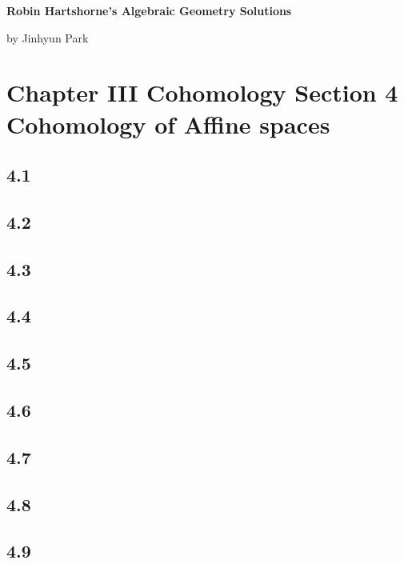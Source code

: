 \documentclass[11pt]{amsart}          %
\begin{document}
\begin{center}
\bf
\large Robin Hartshorne's Algebraic Geometry Solutions
\end{center}
\begin{center}
by Jinhyun Park
\end{center}
\vskip0.5cm

\section*{Chapter III Cohomology Section 4 Cohomology of Affine spaces}
\subsection*{4.1}
\subsection*{4.2}
\subsection*{4.3}
\subsection*{4.4}
\subsection*{4.5}
\subsection*{4.6}
\subsection*{4.7}
\subsection*{4.8}
\subsection*{4.9}
\end{document}
